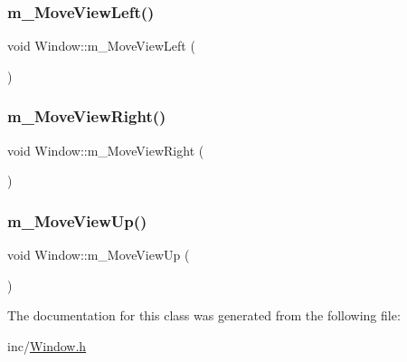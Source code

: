 \mbox{\label{class_window_ab4e96dbf4512f3c7d07aa07f98df74b1}} 
\subsubsection{\texorpdfstring{m\+\_\+\+Move\+View\+Left()}{m\_MoveViewLeft()}}
{\footnotesize\ttfamily void Window\+::m\+\_\+\+Move\+View\+Left (\begin{DoxyParamCaption}{ }\end{DoxyParamCaption})}

\mbox{\label{class_window_af8ea10a23968b335c3e7ece2041641b9}} 
\subsubsection{\texorpdfstring{m\+\_\+\+Move\+View\+Right()}{m\_MoveViewRight()}}
{\footnotesize\ttfamily void Window\+::m\+\_\+\+Move\+View\+Right (\begin{DoxyParamCaption}{ }\end{DoxyParamCaption})}

\mbox{\label{class_window_af3a660b378a2b3c37f3e8e659fed34ea}} 
\subsubsection{\texorpdfstring{m\+\_\+\+Move\+View\+Up()}{m\_MoveViewUp()}}
{\footnotesize\ttfamily void Window\+::m\+\_\+\+Move\+View\+Up (\begin{DoxyParamCaption}{ }\end{DoxyParamCaption})}



The documentation for this class was generated from the following file\+:\begin{DoxyCompactItemize}
\item 
inc/\mbox{\hyperlink{_window_8h}{Window.\+h}}\end{DoxyCompactItemize}
